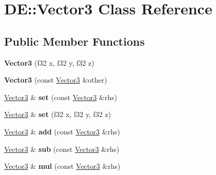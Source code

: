 \hypertarget{classDE_1_1Vector3}{}\section{DE\+:\+:Vector3 Class Reference}
\label{classDE_1_1Vector3}
\subsection*{Public Member Functions}
\begin{DoxyCompactItemize}
\item 
{\bfseries Vector3} (f32 x, f32 y, f32 z)\hypertarget{classDE_1_1Vector3_a6cea5d130cec86a3661af1f5be49c11c}{}\label{classDE_1_1Vector3_a6cea5d130cec86a3661af1f5be49c11c}

\item 
{\bfseries Vector3} (const \hyperlink{classDE_1_1Vector3}{Vector3} \&other)\hypertarget{classDE_1_1Vector3_a327bcbbdce25018c9d82f1a1cf475890}{}\label{classDE_1_1Vector3_a327bcbbdce25018c9d82f1a1cf475890}

\item 
\hyperlink{classDE_1_1Vector3}{Vector3} \& {\bfseries set} (const \hyperlink{classDE_1_1Vector3}{Vector3} \&rhs)\hypertarget{classDE_1_1Vector3_a7a4c371d75a348746c9c35d376cc0c73}{}\label{classDE_1_1Vector3_a7a4c371d75a348746c9c35d376cc0c73}

\item 
\hyperlink{classDE_1_1Vector3}{Vector3} \& {\bfseries set} (f32 x, f32 y, f32 z)\hypertarget{classDE_1_1Vector3_aaa662f4616efb1da45644c4b15d21cec}{}\label{classDE_1_1Vector3_aaa662f4616efb1da45644c4b15d21cec}

\item 
\hyperlink{classDE_1_1Vector3}{Vector3} \& {\bfseries add} (const \hyperlink{classDE_1_1Vector3}{Vector3} \&rhs)\hypertarget{classDE_1_1Vector3_a18028e8f6743bc6b381c1fbc986c9a38}{}\label{classDE_1_1Vector3_a18028e8f6743bc6b381c1fbc986c9a38}

\item 
\hyperlink{classDE_1_1Vector3}{Vector3} \& {\bfseries sub} (const \hyperlink{classDE_1_1Vector3}{Vector3} \&rhs)\hypertarget{classDE_1_1Vector3_a733372d9cb7c0950d9ad03e215f41185}{}\label{classDE_1_1Vector3_a733372d9cb7c0950d9ad03e215f41185}

\item 
\hyperlink{classDE_1_1Vector3}{Vector3} \& {\bfseries mul} (const \hyperlink{classDE_1_1Vector3}{Vector3} \&rhs)\hypertarget{classDE_1_1Vector3_a2f50bfc431e465fea7601a692570817f}{}\label{classDE_1_1Vector3_a2f50bfc431e465fea7601a692570817f}


\end{DoxyCompactItemize}
